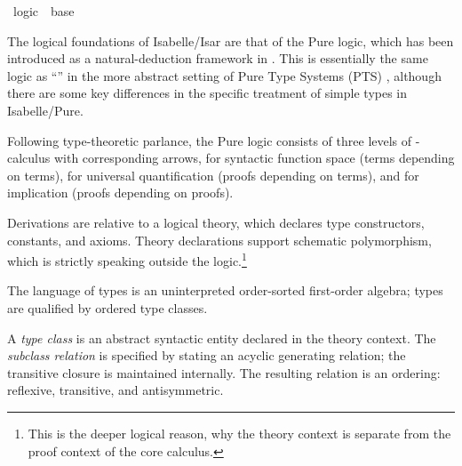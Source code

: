 %
\begin{isabellebody}%
\def\isabellecontext{logic}%
%
\isadelimtheory
%
\endisadelimtheory
%
\isatagtheory
{}\isamarkupfalse%
\ logic\ \ base\ %
\endisatagtheory
{\isafoldtheory}%
%
\isadelimtheory
%
\endisadelimtheory
%
\isamarkuptrue%
%
\begin{isamarkuptext}%
The logical foundations of Isabelle/Isar are that of the Pure logic,
  which has been introduced as a natural-deduction framework in
  \cite{paulson700}.  This is essentially the same logic as ``'' in the more abstract setting of Pure Type Systems (PTS)
  \cite{Barendregt-Geuvers:2001}, although there are some key
  differences in the specific treatment of simple types in
  Isabelle/Pure.

  Following type-theoretic parlance, the Pure logic consists of three
  levels of \isa{{\isasymlambda}}-calculus with corresponding arrows, \isa{{\isasymRightarrow}} for syntactic function space (terms depending on terms), \isa{{\isasymAnd}} for universal quantification (proofs depending on terms), and
  \isa{{\isasymLongrightarrow}} for implication (proofs depending on proofs).

  Derivations are relative to a logical theory, which declares type
  constructors, constants, and axioms.  Theory declarations support
  schematic polymorphism, which is strictly speaking outside the
  logic.\footnote{This is the deeper logical reason, why the theory
  context \isa{{\isasymTheta}} is separate from the proof context \isa{{\isasymGamma}}
  of the core calculus.}%
\end{isamarkuptext}%
\isamarkuptrue%
%
\isamarkuptrue%
%
\begin{isamarkuptext}%
The language of types is an uninterpreted order-sorted first-order
  algebra; types are qualified by ordered type classes.

  \medskip A \emph{type class} is an abstract syntactic entity
  declared in the theory context.  The \emph{subclass relation}  is specified by stating an acyclic
  generating relation; the transitive closure is maintained
  internally.  The resulting relation is an ordering: reflexive,
  transitive, and antisymmetric.


\end{isamarkuptext}
\end{isabellebody}
